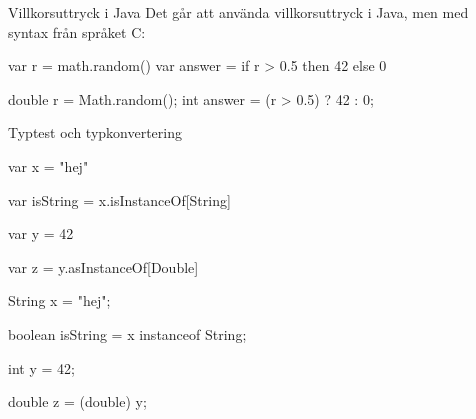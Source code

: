 \begin{Slide}{Villkorsuttryck i Java}\SlideFontSmall
Det går att använda villkorsuttryck i Java, men med syntax från språket C:
\begin{multicols}{2}
  \noindent{}
\begin{CodeSmall}[basicstyle=\ttfamily\SlideFontSize{6}{8},backgroundcolor=\color{white},
  frame=none]
var r = math.random()
var answer = if r > 0.5 then 42 else 0
\end{CodeSmall}

\columnbreak

\noindent{}
\begin{CodeSmall}[language=Java,basicstyle=\ttfamily\SlideFontSize{6}{8},backgroundcolor=\color{white},
  frame=none]
double r = Math.random();
int answer = (r > 0.5) ? 42 : 0;
\end{CodeSmall}
\end{multicols}

\end{Slide}




\begin{Slide}{Typtest och typkonvertering}

\begin{multicols}{2}
  \noindent{}
\begin{CodeSmall}[basicstyle=\small\ttfamily\SlideFontSize{6}{8},backgroundcolor=\color{white},
  frame=none]
var x = "hej"

var isString = x.isInstanceOf[String]

var y = 42

var z = y.asInstanceOf[Double]

\end{CodeSmall}

\columnbreak

\noindent{}
\begin{CodeSmall}[language=Java,basicstyle=\small\ttfamily\SlideFontSize{6}{8},backgroundcolor=\color{white},
  frame=none]
String x = "hej";

boolean isString = x instanceof String;

int y = 42;

double z = (double) y;
\end{CodeSmall}
\end{multicols}


\end{Slide}

